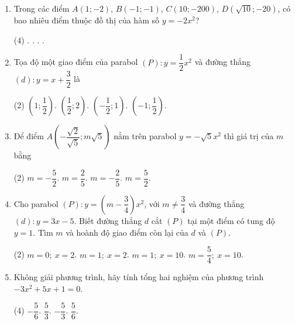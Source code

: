 \begin{practice}
\begin{enumerate}
        \item Trong các điểm $A(1;-2)$, $B(-1;-1)$, $C(10;-200)$, $D(\sqrt{10};-20)$, có bao nhiêu điểm thuộc đồ thị của hàm số $y=-2x^2$?
        \begin{tasks}(4)
            .
            .
            .
            .
        \end{tasks}
        \par\noindent\answerbox\par

        \item Tọa độ một giao điểm của parabol $(P): y=\dfrac{1}{2}x^2$ và đường thẳng $(d): y=x+\dfrac{3}{2}$ là
        \begin{tasks}(2)
            \task[(A)] $\left(1;\dfrac{1}{2}\right)$.
            \task[(B)] $\left(\dfrac{1}{2};2\right)$.
            \task[(C)] $\left(-\dfrac{1}{2};1\right)$.
            \task[(D)] $\left(-1;\dfrac{1}{2}\right)$.
        \end{tasks}
        \par\noindent\answerbox\par

        \item Để điểm $A\left(-\dfrac{\sqrt{2}}{\sqrt{5}};m\sqrt{5}\right)$ nằm trên parabol $y=-\sqrt{5}x^2$ thì giá trị của $m$ bằng
        \begin{tasks}(2)
            \task[(A)] $m=-\dfrac{5}{2}$.
            \task[(B)] $m=\dfrac{2}{5}$.
            \task[(C)] $m=-\dfrac{2}{5}$.
            \task[(D)] $m=\dfrac{5}{2}$.
        \end{tasks}
        \par\noindent\answerbox\par

        \item Cho parabol $(P): y=\left(m-\dfrac{3}{4}\right)x^2$, với $m\ne\dfrac{3}{4}$ và đường thẳng $(d): y=3x-5$. Biết đường thẳng $d$ cắt $(P)$ tại một điểm có tung độ $y=1$. Tìm $m$ và hoành độ giao điểm còn lại của $d$ và $(P)$.
        \begin{tasks}(2)
            \task[(A)] $m=0;\ x=2$.
            \task[(B)] $m=1;\ x=2$.
            \task[(C)] $m=1;\ x=10$.
            \task[(D)] $m=\dfrac{5}{4};\ x=10$.
        \end{tasks}
        \par\noindent\answerbox\par

        \item Không giải phương trình, hãy tính tổng hai nghiệm của phương trình $-3x^2+5x+1=0$.
        \begin{tasks}(4)
            \task[(A)] $-\dfrac{5}{6}$.
            \task[(B)] $\dfrac{5}{3}$.
            \task[(C)] $-\dfrac{5}{3}$.
            \task[(D)] $\dfrac{5}{6}$.
        \end{tasks}
        \par\noindent\answerbox\par


\end{enumerate}
\end{practice}
